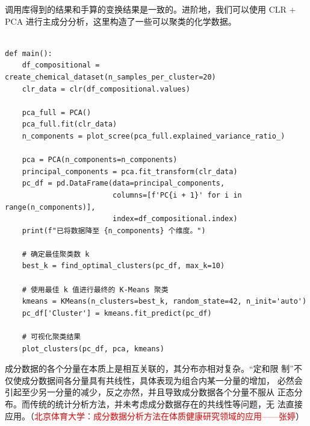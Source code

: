 调用库得到的结果和手算的变换结果是一致的。进阶地，我们可以使用 CLR + PCA 进行主成分分析，这里构造了一些可以聚类的化学数据。

\begin{lstlisting}[style=python]

def main():
    df_compositional = create_chemical_dataset(n_samples_per_cluster=20)
    clr_data = clr(df_compositional.values)

    pca_full = PCA()
    pca_full.fit(clr_data)
    n_components = plot_scree(pca_full.explained_variance_ratio_)

    pca = PCA(n_components=n_components)
    principal_components = pca.fit_transform(clr_data)
    pc_df = pd.DataFrame(data=principal_components,
                         columns=[f'PC{i + 1}' for i in range(n_components)],
                         index=df_compositional.index)
    print(f"已将数据降至 {n_components} 个维度。")

    # 确定最佳聚类数 k
    best_k = find_optimal_clusters(pc_df, max_k=10)

    # 使用最佳 k 值进行最终的 K-Means 聚类
    kmeans = KMeans(n_clusters=best_k, random_state=42, n_init='auto')
    pc_df['Cluster'] = kmeans.fit_predict(pc_df)

    # 可视化聚类结果
    plot_clusters(pc_df, pca, kmeans)
\end{lstlisting}

成分数据的各个分量在本质上是相互关联的，其分布亦相对复杂。“定和限
制”不仅使成分数据间各分量具有共线性，具体表现为组合内某一分量的增加，
必然会引起至少另一分量的减少，反之亦然，并且导致成分数据各个分量不服从
正态分布。而传统的统计分析方法，并未考虑成分数据存在的共线性等问题，无
法直接应用。（\textcolor{red}{北京体育大学：成分数据分析方法在体质健康研究领域的应用——张婷}）
